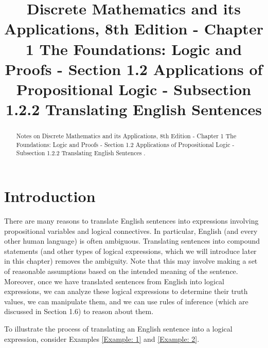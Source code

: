 \documentclass{Axon}
\title{Discrete Mathematics and its Applications, 8th Edition - Chapter 1 The Foundations: Logic and Proofs - Section 1.2 Applications of Propositional Logic - Subsection 1.2.2 Translating English Sentences}
\begin{document}
\maketitle
\makeauthor
\begin{abstract}
Notes on Discrete Mathematics and its Applications, 8th Edition - Chapter 1 The Foundations: Logic and Proofs - Section 1.2 Applications of Propositional Logic - Subsection 1.2.2 Translating English Sentences \cite{Rosen}.
\end{abstract}
\section{Introduction}
There are many reasons to translate English sentences into expressions involving propositional variables and logical connectives. In particular, English (and every other human language) is often ambiguous. Translating sentences into compound statements (and other types of logical expressions, which we will introduce later in this chapter) removes the ambiguity. Note that this may involve making a set of reasonable assumptions based on the intended meaning of the sentence. Moreover, once we have translated sentences from English into logical expressions, we can analyze these logical expressions to determine their truth values, we can manipulate them, and we can use rules of inference (which are discussed in Section 1.6) to reason about them.

To illustrate the process of translating an English sentence into a logical expression, consider Examples \ref{Example: 1} and \ref{Example: 2}.
\end{document}
